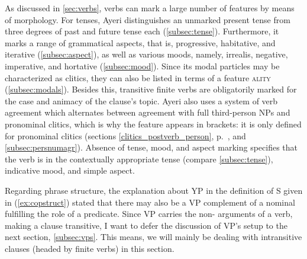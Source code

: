 As discussed in \autoref{sec:verbs}, verbs can mark a large number of features
by means of morphology. For tenses, Ayeri distinguishes an unmarked present
tense from three degrees of past and future tense each
(\autoref{subsec:tense}). Furthermore, it marks a range of grammatical aspects,
that is, progressive, habitative, and iterative (\autoref{subsec:aspect}), as
well as various moods, namely, irrealis, negative, imperative, and hortative
(\autoref{subsec:mood}). Since its modal particles may be characterized as
clitics, they can also be listed in terms of a feature \Mod\textsc{ality}
(\autoref{subsec:modals}). Besides this, transitive finite verbs are
obligatorily marked for the case and animacy of the clause's topic. Ayeri also
uses a system of verb agreement which alternates between agreement with full
third-person NPs and pronominal clitics, which is why the feature \ups{\Subj{}
\Pred} appears in brackets: it is only defined for pronominal clitics (sections
\ref{clitics_postverb_person}, p.~\pageref{clitics_postverb_person}, and
\ref{subsec:persnumagr}). Absence of tense, mood, and aspect marking specifies
that the verb is in the contextually appropriate tense (compare
\autoref{subsec:tense}), indicative mood, and simple aspect.

Regarding phrase structure, the explanation about YP in the definition of S
given in (\ref{ex:copstruct}) stated that there may also be a VP complement of
a nominal fulfilling the role of a predicate. Since VP carries the non-\Subj{}
arguments of a verb, making a clause transitive, I want to defer the discussion
of VP's setup to the next section, \ref{subsec:vps}. This means, we will mainly
be dealing with intransitive clauses (headed by finite verbs) in this section.

